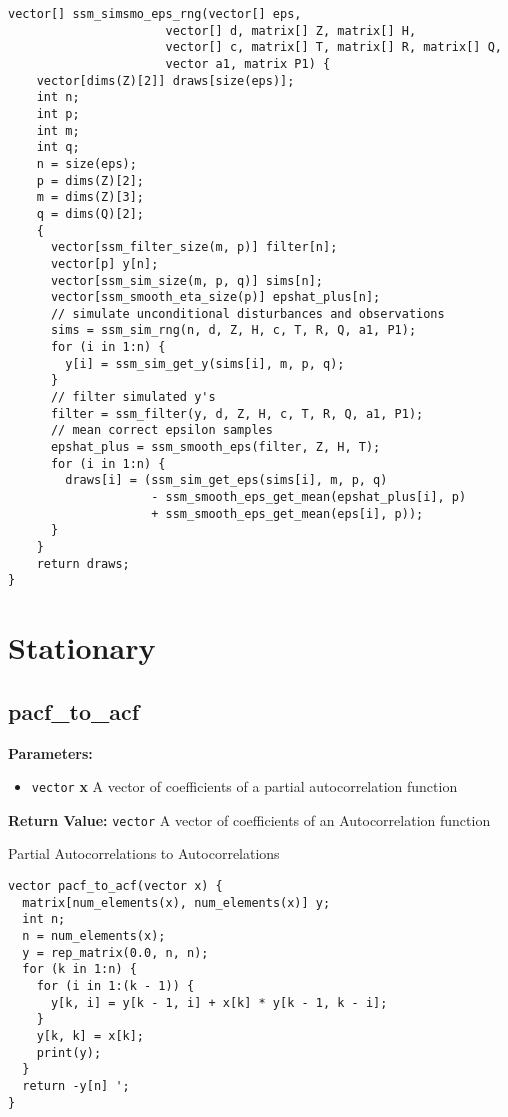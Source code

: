 \documentclass[]{book}
\providecommand{\tightlist}{%
  \setlength{\itemsep}{0pt}\setlength{\parskip}{0pt}}
\begin{document}
\begin{verbatim}
vector[] ssm_simsmo_eps_rng(vector[] eps,
                      vector[] d, matrix[] Z, matrix[] H,
                      vector[] c, matrix[] T, matrix[] R, matrix[] Q,
                      vector a1, matrix P1) {
    vector[dims(Z)[2]] draws[size(eps)];
    int n;
    int p;
    int m;
    int q;
    n = size(eps);
    p = dims(Z)[2];
    m = dims(Z)[3];
    q = dims(Q)[2];
    {
      vector[ssm_filter_size(m, p)] filter[n];
      vector[p] y[n];
      vector[ssm_sim_size(m, p, q)] sims[n];
      vector[ssm_smooth_eta_size(p)] epshat_plus[n];
      // simulate unconditional disturbances and observations
      sims = ssm_sim_rng(n, d, Z, H, c, T, R, Q, a1, P1);
      for (i in 1:n) {
        y[i] = ssm_sim_get_y(sims[i], m, p, q);
      }
      // filter simulated y's
      filter = ssm_filter(y, d, Z, H, c, T, R, Q, a1, P1);
      // mean correct epsilon samples
      epshat_plus = ssm_smooth_eps(filter, Z, H, T);
      for (i in 1:n) {
        draws[i] = (ssm_sim_get_eps(sims[i], m, p, q)
                    - ssm_smooth_eps_get_mean(epshat_plus[i], p)
                    + ssm_smooth_eps_get_mean(eps[i], p));
      }
    }
    return draws;
}
\end{verbatim}

\section{Stationary}\label{stationary}

\subsection{pacf\_to\_acf}\label{pacfux5ftoux5facf}

\textbf{Parameters:}

\begin{itemize}
\tightlist
\item
  \texttt{vector} \textbf{x} A vector of coefficients of a partial
  autocorrelation function
\end{itemize}

\textbf{Return Value:} \texttt{vector} A vector of coefficients of an
Autocorrelation function

Partial Autocorrelations to Autocorrelations

\begin{verbatim}
vector pacf_to_acf(vector x) {
  matrix[num_elements(x), num_elements(x)] y;
  int n;
  n = num_elements(x);
  y = rep_matrix(0.0, n, n);
  for (k in 1:n) {
    for (i in 1:(k - 1)) {
      y[k, i] = y[k - 1, i] + x[k] * y[k - 1, k - i];
    }
    y[k, k] = x[k];
    print(y);
  }
  return -y[n] ';
}
\end{verbatim}
\end{document}
